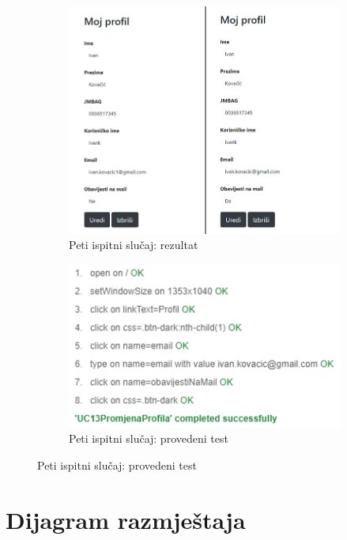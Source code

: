  	\begin{figure}[H]
 		\centering
 		\begin{subfigure}{.5\textwidth}
 			\centering
 			\includegraphics[scale=1.5]{slike/test5Ekran.png}
 			\caption{Peti ispitni slučaj: rezultat}
 			\label{fig:petiIspitniSlucaj}
 		\end{subfigure}%
 		\begin{subfigure}{.5\textwidth}
 			\centering
 			\includegraphics[scale=0.7]{slike/test5.png}
 			\caption{Peti ispitni slučaj: provedeni test}
 			\label{fig:petiIspitniSlucajTest}%
 		\end{subfigure}
 	\end{figure}
 		
 		
 		
 		\eject 
			
			\eject 
		
		
		\section{Dijagram razmještaja}
		
